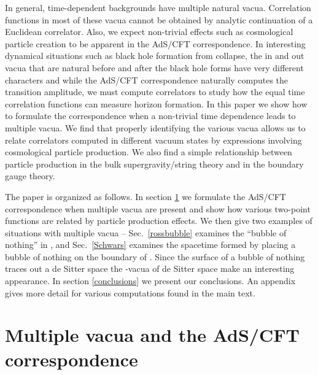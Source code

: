 \documentclass[a4paper,aps,prd,preprintnumbers,groupedaddress]{revtex4}
\begin{document}
In general, time-dependent backgrounds have multiple natural vacua.  Correlation functions in most of these vacua cannot be
obtained by analytic continuation of a Euclidean correlator.
Also, we expect non-trivial effects such as cosmological particle creation
to be apparent in the AdS/CFT correspondence. 
In interesting dynamical situations such as black hole formation from collapse, the in and out vacua that are natural before and after the black hole forms have very different characters and while the AdS/CFT correspondence naturally computes the \coordHE{} transition amplitude,  we must compute \coordHE{} correlators to study how the equal time correlation functions can measure horizon formation.  In this paper we show how to formulate the correspondence when a non-trivial time dependence
leads to multiple vacua. We find that properly identifying the various vacua allows us to relate correlators computed in different vacuum
states by expressions involving cosmological particle production. We also find a simple relationship between particle production in the bulk
supergravity/string theory and in the boundary gauge theory.

The paper is organized as follows. In section \ref{ads-cft} we formulate the AdS/CFT correspondence when multiple vacua are present and show how various two-point functions are related by particle production effects.   We then give two examples of situations with multiple vacua -- Sec.~\ref{rossbubble} examines the ``bubble of nothing'' in  \coordHE{} \cite{birm,vijayross}, and Sec.~\ref{Schwars} examines the spacetime formed by placing a bubble of nothing on the boundary of \coordHE{}.
Since the surface of a bubble of nothing traces out a de Sitter space  the
 \myHighlight{$\alpha$}\coordHE{}-vacua of de Sitter space make an interesting appearance.
In section \ref{conclusions} we present our conclusions. An appendix gives more detail for
various computations found in the main text.

\section{Multiple vacua and the AdS/CFT correspondence} \label{ads-cft}
\end{document}
